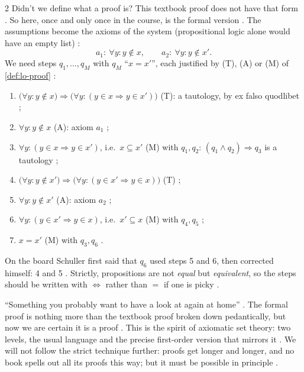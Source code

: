 \begin{paracol}{2}
Didn't we define what a proof is? This textbook proof does not have that form . So here, once and only
once in the course, is the formal version . The assumptions become the axioms of the system
(propositional logic alone would have an empty list) :
\[
  a_1:\ \forall y\colon y\notin x,\qquad a_2:\ \forall y\colon y\notin x'.
\]
We need steps $q_1,\dots,q_M$ with $q_M$ ``$x=x'$'', each justified by (T), (A) or (M) of \cref{def:lo-proof}
:
\begin{enumerate}
  \item[$q_1$] $\bigl(\forall y\colon y\notin x\bigr)\Rightarrow\bigl(\forall y\colon (y\in x\Rightarrow y\in x')\bigr)$
        \hfill (T): a tautology, by ex falso quodlibet ;
  \item[$q_2$] $\forall y\colon y\notin x$ \hfill (A): axiom $a_1$ ;
  \item[$q_3$] $\forall y\colon (y\in x\Rightarrow y\in x')$, i.e.\ $x\subseteq x'$ \hfill (M) with $q_1,q_2$:
        $(q_1\wedge q_2)\Rightarrow q_3$ is a tautology ;
  \item[$q_4$] $\bigl(\forall y\colon y\notin x'\bigr)\Rightarrow\bigl(\forall y\colon (y\in x'\Rightarrow y\in x)\bigr)$
        \hfill (T) ;
  \item[$q_5$] $\forall y\colon y\notin x'$ \hfill (A): axiom $a_2$ ;
  \item[$q_6$] $\forall y\colon (y\in x'\Rightarrow y\in x)$, i.e.\ $x'\subseteq x$ \hfill (M) with $q_4,q_5$
        ;
  \item[$q_7$] $x=x'$ \hfill (M) with $q_3,q_6$ .
\end{enumerate}
\begin{coursenote}
On the board Schuller first said that $q_6$ used steps 5 and 6, then corrected himself: 4 and 5
. Strictly, propositions are not \emph{equal} but \emph{equivalent}, so the steps should be written with
$\Leftrightarrow$ rather than $=$ if one is picky .
\end{coursenote}
``Something you probably want to have a look at again at home'' . The formal proof is nothing more
than the textbook proof broken down pedantically, but now we are certain it is a proof . This is the
spirit of axiomatic set theory: two levels, the usual language and the precise first-order version that mirrors it
. We will not follow the strict technique further: proofs get longer and longer, and no
book spells out all its proofs this way; but it must be possible in principle .


\end{paracol}
